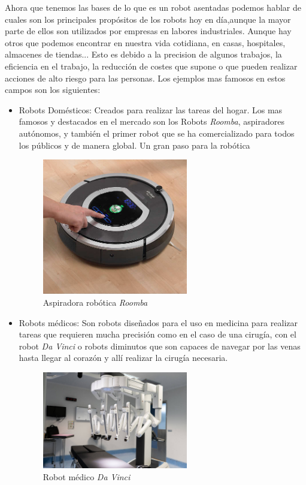 Ahora que tenemos las bases de lo que es un robot asentadas podemos hablar de cuales son los principales propósitos de los robots hoy en día,aunque la mayor parte de ellos son utilizados por empresas en labores industriales. Aunque hay otros que podemos encontrar en nuestra vida cotidiana, en casas, hospitales, almacenes de tiendas... Esto es debido a la precision de algunos trabajos, la eficiencia en el trabajo, la reducción de costes que supone o que pueden realizar acciones de alto riesgo para las personas. Los ejemplos mas famosos en estos campos son los siguientes:
\begin{itemize}
    \item Robots Domésticos: Creados para realizar las tareas del hogar. Los mas famosos y destacados en el mercado son los Robots \textit{Roomba}, aspiradores autónomos, y también el primer robot que se ha comercializado para todos los públicos y de manera global. Un gran paso para la robótica

\begin{figure}[H]
    \centering
    \includegraphics[width=0.6\textwidth]{img/roomba.jpg}
    \caption{Aspiradora robótica \textit{Roomba}} \label{fig:roomba}
    \end{figure}

    \item Robots médicos: Son robots diseñados para el uso en medicina para realizar tareas que requieren mucha precisión como en el caso de una cirugía, con el robot \textit{Da Vinci} o robots diminutos que son capaces de navegar por las venas hasta llegar al corazón y allí realizar la cirugía necesaria.
      \begin{figure}[H]
    \centering
    \includegraphics[width=0.6\textwidth]{img/davinci.jpg}
    \caption{Robot médico \textit{Da Vinci}} \label{fig:davinci}
    \end{figure}
    

\end{itemize}
